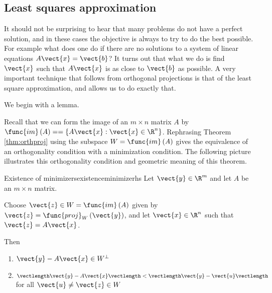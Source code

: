 \subsection{Least squares approximation}

It should not be surprising to hear that many problems do not have a
perfect solution, and in these cases the objective is always to try to
do the best possible. For example what does one do if there are no
solutions to a system of linear equations $A\vect{x}=\vect{b}$? It
turns out that what we do is find $\vect{x}$ such that $A\vect{x}$ is
as close to $\vect{b}$ as possible. A very important technique that
follows from orthogonal projections is that of the least square
approximation, and allows us to do
exactly that.

We begin with a lemma. 

Recall that we can form the image of an $m \times n$ matrix $A$ by
$\func{im}\left( A\right) = = \left\{ A\vect{x} : \vect{x} \in
\R^n \right\}$. Rephrasing Theorem \ref{thm:orthproj} using
the subspace $W=\func{im}\left( A\right)$  gives the
equivalence of an orthogonality condition with a minimization
condition. The following picture
illustrates this orthogonality condition and geometric meaning of this
theorem.

\begin{center}
\end{center}

\begin{theorem}{Existence of minimizers}{existenceminimizerhs}\label{existenceminimizerhs}
Let $\vect{y}\in \R^{m}$ and let $A$ be an $m\times n$ matrix.

Choose $\vect{z}\in W= \func{im}\left( A\right)$ given by $\vect{z} =
\func{proj}_{W}\left( \vect{y}\right)$, and let $\vect{x} \in \R^{n}$ such that $\vect{z}=A\vect{x}$.

Then
\begin{enumerate}
\item $\vect{y} - A\vect{x} \in W^{\perp}$
\item $\vectlength \vect{y} - A\vect{x} \vectlength < \vectlength \vect{y} - \vect{u} \vectlength$ for all $\vect{u} \neq \vect{z} \in W$
\end{enumerate}
\end{theorem}

